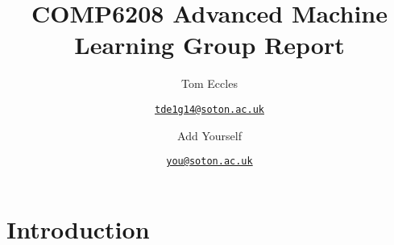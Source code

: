 \documentclass[10pt,a4paper]{article}
\title{COMP6208 Advanced Machine Learning Group Report}
\author{Tom Eccles \and \texttt{\href{mailto:tde1g14@soton.ac.uk}{tde1g14@soton.ac.uk}} \and
        Add Yourself \and \texttt{\href{mailto:you@soton.ac.uk}{you@soton.ac.uk}}}
\begin{document}
  \maketitle
  
  \section{Introduction}
  \label{sec:intro}
    
  \printbibliography
  
  \appendix
\end{document}
